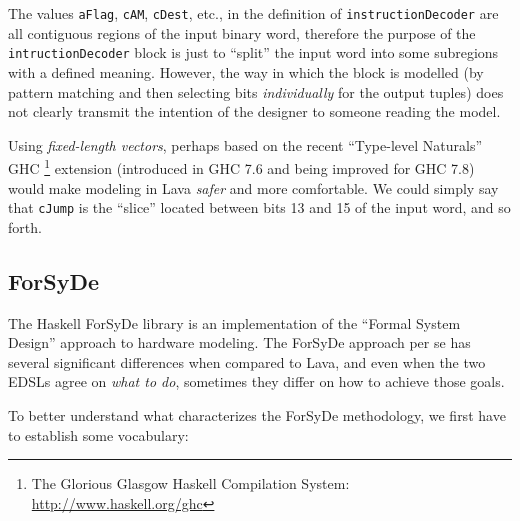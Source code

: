             The values \texttt{aFlag}, \texttt{cAM}, \texttt{cDest}, etc., in the definition of
            \texttt{instructionDecoder} are all contiguous regions of the input binary word,
            therefore the purpose of the \texttt{intructionDecoder} block is just to ``split'' the
            input word into some subregions with a defined meaning. However, the way in which the
            block is modelled (by pattern matching and then selecting bits \emph{individually} for
            the output tuples) does not clearly transmit the intention of the designer to someone
            reading the model.

            Using \emph{fixed-length vectors}, perhaps based on the recent ``Type-level Naturals''
            GHC \footnote{The Glorious Glasgow Haskell Compilation System:
                \url{http://www.haskell.org/ghc}} extension \cite{website:ghc-typenats} (introduced
            in GHC 7.6 and being improved for GHC 7.8) would make modeling in Lava \emph{safer} and
            more comfortable. We could simply say that \texttt{cJump} is the ``slice'' located
            between bits 13 and 15 of the input word, and so forth.


    \subsection{ForSyDe}
    \label{subsec:forsyde}
        The Haskell ForSyDe library is an implementation of the ``Formal System Design'' approach to
        hardware modeling\cite{forsyde1999}. The ForSyDe approach per se has several significant
        differences when compared to Lava, and even when the two EDSLs agree on \emph{what to do},
        sometimes they differ on how to achieve those goals.

        To better understand what characterizes the ForSyDe methodology, we first have to establish
        some vocabulary:


